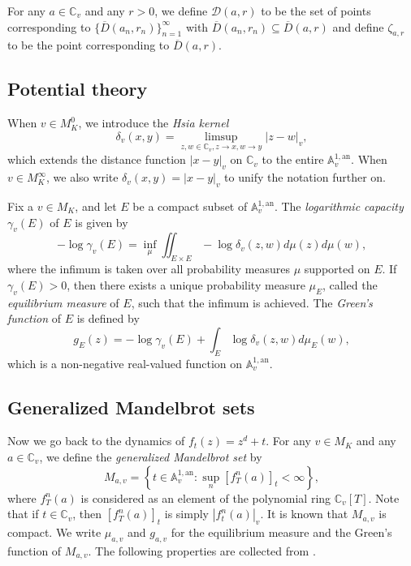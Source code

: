 \documentclass[11pt]{amsart}
\numberwithin{equation}{section}
\theoremstyle{plain}
\theoremstyle{definition}
\theoremstyle{remark}
\newcommand{\A}{\mathbb A}
\newcommand{\C}{\mathbb C}
\newcommand{\an}{\mathrm{an}}
\begin{document}
For any $a\in\C_{v}$ and any $r>0$, we define $\mathcal{D}(a,r)$ to be
the set of points corresponding to
$\{\overline{D}(a_{n},r_{n})\}_{n=1}^{\infty}$ with
$\overline{D}(a_{n},r_{n})\subseteq\overline{D}(a,r)$ and define
$\zeta_{a,r}$ to be the point corresponding to $\overline{D}(a,r)$.

\subsection{Potential theory}\label{sec2.2}

When $v\in M_{K}^{0}$, we introduce the \textit{Hsia kernel}
\[
\delta_{v}(x,y)=\limsup_{z,w\in\C_{v},z\to x,w\to y}|z-w|_{v},
\]
which extends the distance function $|x-y|_{v}$ on $\C_{v}$ to the
entire $\A_{v}^{1,\an}$. When $v\in M_{K}^{\infty}$, we also write
$\delta_{v}(x,y)=|x-y|_{v}$ to unify the notation further on.

Fix a $v\in M_{K}$, and let $E$ be a compact subset of $\A_{v}^{1,\an}$.
The \textit{logarithmic capacity} $\gamma_{v}(E)$ of $E$ is given
by
\[
-\log\gamma_{v}(E)=\inf_{\mu}\iint_{E\times E}-\log\delta_{v}(z,w)d\mu(z)d\mu(w),
\]
where the infimum is taken over all probability measures $\mu$ supported
on $E$. If $\gamma_{v}(E)>0$, then there exists a unique probability
measure $\mu_{E}$, called the \textit{equilibrium measure} of $E$,
such that the infimum is achieved. The \textit{Green's function} of
$E$ is defined by
\[
g_{E}(z)=-\log\gamma_{v}(E)+\int_{E}\log\delta_{v}(z,w)d\mu_{E}(w),
\]
which is a non-negative real-valued function on $\A_{v}^{1,\an}$.

\subsection{Generalized Mandelbrot sets}\label{sec2.3}

Now we go back to the dynamics of $f_{t}(z)=z^{d}+t$. For any $v\in M_{K}$
and any $a\in\C_{v}$, we define the \textit{generalized Mandelbrot
set} by
\[
M_{a,v}=\left\{t\in\A_{v}^{1,\an}:\sup_{n}\left[f_{T}^{n}(a)\right]_{t}<\infty\right\},
\]
where $f_{T}^{n}(a)$ is considered as an element of the polynomial
ring $\C_{v}[T]$. Note that if $t\in\C_{v}$, then
$[f_{T}^{n}(a)]_{t}$ is simply $|f_{t}^{n}(a)|_{v}$. It is known
that $M_{a,v}$ is compact. We write $\mu_{a,v}$ and $g_{a,v}$ for
the equilibrium measure and the Green's function of $M_{a,v}$. The
following properties are collected from \cite[Section 3]{BD1}.
\end{document}
